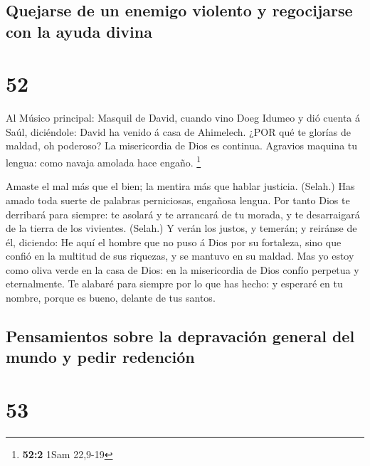\hypertarget{quejarse-de-un-enemigo-violento-y-regocijarse-con-la-ayuda-divina}{%
\subsection{Quejarse de un enemigo violento y regocijarse con la ayuda
divina}\label{quejarse-de-un-enemigo-violento-y-regocijarse-con-la-ayuda-divina}}

\hypertarget{section-51}{%
\section{52}\label{section-51}}

 Al Músico principal: Masquil de David, cuando vino Doeg
Idumeo y dió cuenta á Saúl, diciéndole: David ha venido á casa de
Ahimelech. ¿POR qué te glorías de maldad, oh poderoso? La misericordia
de Dios es continua.  Agravios maquina tu lengua: como
navaja amolada hace engaño. \footnote{\textbf{52:2} 1Sam 22,9-19}

 Amaste el mal más que el bien; la mentira más que hablar
justicia. (Selah.)  Has amado toda suerte de palabras
perniciosas, engañosa lengua.  Por tanto Dios te derribará
para siempre: te asolará y te arrancará de tu morada, y te desarraigará
de la tierra de los vivientes. (Selah.)  Y verán los justos,
y temerán; y reiránse de él, diciendo:  He aquí el hombre
que no puso á Dios por su fortaleza, sino que confió en la multitud de
sus riquezas, y se mantuvo en su maldad.  Mas yo estoy como
oliva verde en la casa de Dios: en la misericordia de Dios confío
perpetua y eternalmente.  Te alabaré para siempre por lo que
has hecho: y esperaré en tu nombre, porque es bueno, delante de tus
santos.

\hypertarget{pensamientos-sobre-la-depravaciuxf3n-general-del-mundo-y-pedir-redenciuxf3n-1}{%
\subsection{Pensamientos sobre la depravación general del mundo y pedir
redención}\label{pensamientos-sobre-la-depravaciuxf3n-general-del-mundo-y-pedir-redenciuxf3n-1}}

\hypertarget{section-52}{%
\section{53}\label{section-52}}

